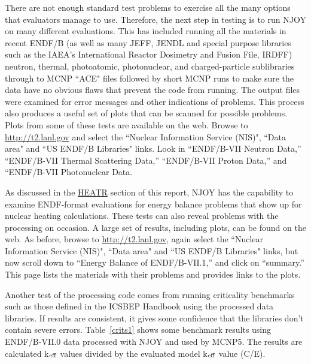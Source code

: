 There are not enough standard test problems to exercise all the many
options that evaluators manage to use.  Therefore, the next step
in testing is to run NJOY on many different evaluations.  This
has included running all the materials in recent ENDF/B (as well as
many JEFF, JENDL and special purpose libraries such as the IAEA's
International Reactor Dosimetry and Fusion File, IRDFF) neutron,
thermal, photoatomic, photonuclear, and charged-particle
sublibraries through to MCNP ``ACE" files followed by
short MCNP runs to make sure the data have no obvious flaws
that prevent the code from running.  The output files were examined
for error messages and other indications of problems.
This process also produces a useful set of plots that can be
scanned for possible problems.  Plots from some of these
tests are available on the web.  Browse to
\href{http://t2.lanl.gov}{http://t2.lanl.gov} and select the
``Nuclear Information Service (NIS)", ``Data area"
and ``US ENDF/B Libraries" links.
Look in ``ENDF/B-VII Neutron Data,'' ``ENDF/B-VII Thermal
Scattering Data,'' ``ENDF/B-VII Proton Data,'' and ``ENDF/B-VII
Photonuclear Data.

As discussed in the \hyperlink{sHEATRhy}{HEATR} section of this
report, NJOY has the capability to examine ENDF-format evaluations
for energy balance problems that show up for nuclear heating
calculations.  These tests can also reveal problems with the
processing on occasion.  A large set of results, including plots,
can be found on the web.  As before, browse to
\href{http://t2.lanl.gov}{http://t2.lanl.gov}, again select
the ``Nuclear Information Service (NIS)", ``Data area"
and ``US ENDF/B Libraries" links, but now
scroll down to ``Energy Balance of ENDF/B-VII.1,'' and click on
``summary.''  This page lists the materials with their problems
and provides links to the plots.

Another test of the processing code comes from running
criticality benchmarks such as those defined in the ICSBEP
Handbook\cite{ICSBEP} using the processed data
libraries.  If results are consistent, it gives some confidence
that the libraries don't contain severe errors.  Table~\ref{crits1}
shows some benchmark results using ENDF/B-VII.0 data processed
with NJOY and used by MCNP5.  The results are calculated
k$_{\rm eff}$ values divided by the evaluated model
k$_{\rm eff}$ value (C/E).

